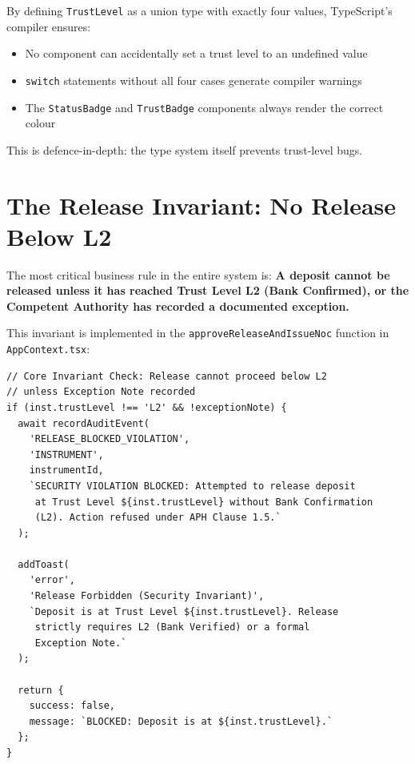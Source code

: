 \documentclass[12pt, a4paper]{report}
\begin{document}
\begin{designbox}[title={Why TypeScript Union Types for Trust Levels?}]
By defining \texttt{TrustLevel} as a union type with exactly four values, TypeScript's compiler ensures:
\begin{itemize}
  \item No component can accidentally set a trust level to an undefined value
  \item \texttt{switch} statements without all four cases generate compiler warnings
  \item The \texttt{StatusBadge} and \texttt{TrustBadge} components always render the correct colour
\end{itemize}
This is defence-in-depth: the type system itself prevents trust-level bugs.
\end{designbox}

\section{The Release Invariant: No Release Below L2}

The most critical business rule in the entire system is: \textbf{A deposit cannot be released unless it has reached Trust Level L2 (Bank Confirmed), or the Competent Authority has recorded a documented exception.}

This invariant is implemented in the \texttt{approveReleaseAndIssueNoc} function in \texttt{AppContext.tsx}:

\begin{lstlisting}[caption={Release Invariant Enforcement (AppContext.tsx, lines 688--711)}, label={lst:release-block}]
// Core Invariant Check: Release cannot proceed below L2
// unless Exception Note recorded
if (inst.trustLevel !== 'L2' && !exceptionNote) {
  await recordAuditEvent(
    'RELEASE_BLOCKED_VIOLATION',
    'INSTRUMENT',
    instrumentId,
    `SECURITY VIOLATION BLOCKED: Attempted to release deposit
     at Trust Level ${inst.trustLevel} without Bank Confirmation
     (L2). Action refused under APH Clause 1.5.`
  );

  addToast(
    'error',
    'Release Forbidden (Security Invariant)',
    `Deposit is at Trust Level ${inst.trustLevel}. Release
     strictly requires L2 (Bank Verified) or a formal
     Exception Note.`
  );

  return {
    success: false,
    message: `BLOCKED: Deposit is at ${inst.trustLevel}.`
  };
}
\end{lstlisting}
\end{document}
